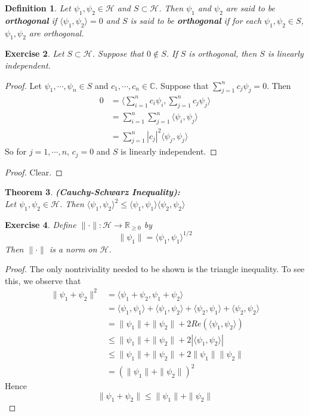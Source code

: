 \documentclass[12pt]{amsart}
\newtheorem{thm}{Theorem}[section]
\newtheorem{defn}[thm]{Definition}
\newtheorem{ex}[thm]{Exercise}
\renewcommand{\r}{\rangle}
\renewcommand{\l}{\langle}
\newcommand{\C}{\mathbb{C}}
\newcommand{\R}{\mathbb{R}}
\newcommand{\MH}{\mathcal{H}}
\begin{document}
\begin{defn}
	Let $\psi_1, \psi_2 \in \MH$ and $S \subset \MH$. Then $\psi_1$ and $\psi_2$ are said to be \textbf{orthogonal} if $\l \psi_1,\psi_2\r = 0$ and $S$ is said to be \textbf{orthogonal} if for each $\psi_1,\psi_2 \in S$, $\psi_1,\psi_2$ are orthogonal. 
\end{defn}

\begin{ex}
	Let $S \subset \MH$. Suppose that $0 \not \in S$. If $S$ is orthogonal, then $S$ is linearly independent.
\end{ex}

\begin{proof}
	Let $\psi_1, \cdots, \psi_n \in S$ and $c_1, \cdots, c_n \in \C$. Suppose that $\sum\limits_{j =1}^n c_j \psi_j = 0 $. Then 
	\begin{align*}
		0
		&= \bigg \l \sum_{i=1}^n c_i\psi_i , \sum_{j=1}^n c_j\psi_j \bigg \r \\
		&= \sum_{i=1}^n \sum_{j=1}^n \l \psi_i, \psi_j \r \\
		&= \sum_{j=1}^n  |c_j|^2 \l \psi_j, \psi_j \r
	\end{align*}
	So for $j = 1 , \cdots, n$, $c_j = 0$ and $S$ is linearly independent.
\end{proof}

\begin{proof}
	Clear.
\end{proof}

\begin{thm}\textbf{(Cauchy-Schwarz Inequality):} \\
	Let $\psi_1,\psi_2 \in \MH$. Then $\l \psi_1,\psi_2\r^2 \leq \l \psi_1,\psi_1 \r \l \psi_2,\psi_2 \r$
\end{thm}

\begin{ex}
	Define $\|\cdot \| : \MH \rightarrow \R_{\geq 0}$ by $$\|\psi_1\| = \l \psi_1, \psi_1\r^{1/2}$$ Then $\|\cdot\|$ is a norm on $\MH$.
\end{ex}

\begin{proof}
	The only nontriviality needed to be shown is the triangle inequality. To see this, we observe that 
	\begin{align*}
		\| \psi_1+ \psi_2 \|^2 
		&= \l \psi_1+\psi_2 , \psi_1+\psi_2\r \\
		&= \l \psi_1,\psi_1 \r + \l \psi_1,\psi_2\r + \l \psi_2,\psi_1 \r + \l \psi_2,\psi_2 \r \\
		&= \|\psi_1\| + \| \psi_2 \| + 2 Re(\l \psi_1,\psi_2 \r) \\
		& \leq \|\psi_1\| + \| \psi_2 \| + 2| \l \psi_1 , \psi_2 \r| \\
		& \leq  \|\psi_1\| + \| \psi_2 \| + 2 \| \psi_1\| \|\psi_2\| \\ 
		&= (\|\psi_1 \| + \| \psi_2 \|)^2
	\end{align*}
	Hence $$\| \psi_1+ \psi_2 \| \leq \|\psi_1 \| + \| \psi_2 \|$$
\end{proof}
\end{document}
